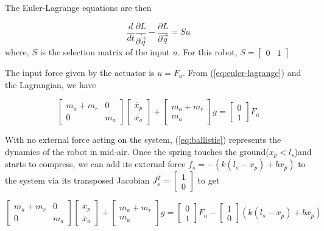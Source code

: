 \documentclass[12pt, a4paper]{report}
\begin{document}
The Euler-Lagrange equations are then

\begin{equation}
	\frac{d}{dt}\frac{\partial L}{\partial \dot{\vec{q}}} - \frac{\partial L}{\partial \vec{q}} = Su
	\label{eq:euler-lagrange}
\end{equation}
where,
$S$ is the selection matrix of the input $u$. For this robot, $S = \begin{bmatrix}
0&1
\end{bmatrix}$\par 
The input force given by the actuator is $u = F_{a}$. From (\ref{eq:euler-lagrange}) and the Lagrangian, we have

\begin{equation}
\begin{bmatrix}
m_{a} + m_{r}&0\\
0 & m_{a}
\end{bmatrix}
\begin{bmatrix}
\ddot{x_{p}}\\
\ddot{x_{a}}
\end{bmatrix}
+\begin{bmatrix}
m_{a}+m_{r}\\m_{a}
\end{bmatrix}g =
\begin{bmatrix}
0\\1
\end{bmatrix}
F_{a}
\label{eq:ballistic}
\end{equation}

With no external force acting on the system, (\ref{eq:ballistic}) represents the dynamics of the robot in mid-air. Once the spring touches the ground($x_{p}<l_{s}$)and starts to compress, we can add its external force $f_{s} = -(k(l_{s}-x_{p})+b\dot{x_{p}})$ to the system via its transposed Jacobian $J_{s}^{T} = \begin{bmatrix}
1\\0
\end{bmatrix}$ to get

\begin{equation}
\begin{bmatrix}
m_{a} + m_{r}&0\\
0 & m_{a}
\end{bmatrix}
\begin{bmatrix}
\ddot{x_{p}}\\
\ddot{x_{a}}
\end{bmatrix}
+\begin{bmatrix}
m_{a}+m_{r}\\m_{a}
\end{bmatrix}g =
\begin{bmatrix}
0\\1
\end{bmatrix}
F_{a} - 
\begin{bmatrix}
1\\0
\end{bmatrix}
(k(l_{s}-x_{p})+b\dot{x_{p}})
\label{eq:ground}
\end{equation}
\end{document}
